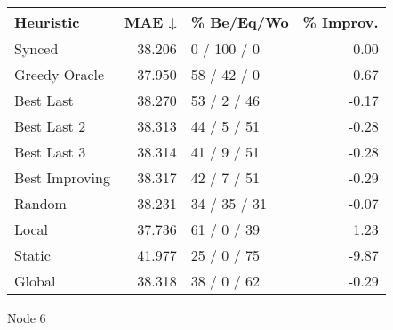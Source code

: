 \begin{tabular}{lrlr}
\toprule
\textbf{Heuristic} & \textbf{MAE ↓} & \textbf{\% Be/Eq/Wo} & \textbf{\% Improv.} \\
\midrule
            Synced &         38.206 &          0 / 100 / 0 &                0.00 \\
     Greedy Oracle &         37.950 &          58 / 42 / 0 &                0.67 \\
         Best Last &         38.270 &          53 / 2 / 46 &               -0.17 \\
       Best Last 2 &         38.313 &          44 / 5 / 51 &               -0.28 \\
       Best Last 3 &         38.314 &          41 / 9 / 51 &               -0.28 \\
    Best Improving &         38.317 &          42 / 7 / 51 &               -0.29 \\
            Random &         38.231 &         34 / 35 / 31 &               -0.07 \\
             Local &         37.736 &          61 / 0 / 39 &                1.23 \\
            Static &         41.977 &          25 / 0 / 75 &               -9.87 \\
            Global &         38.318 &          38 / 0 / 62 &               -0.29 \\
\bottomrule
\end{tabular}
\caption{Node 6}
\label{tab:non_lr01_le2_bs4_6}
